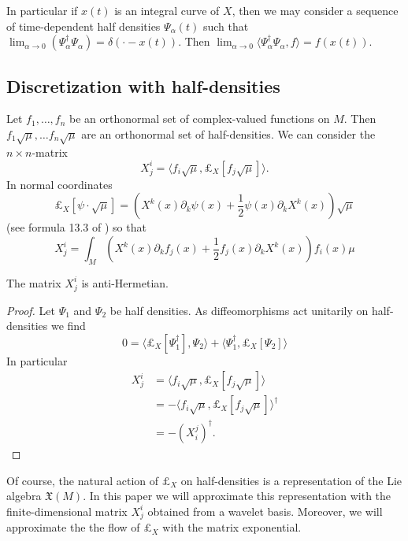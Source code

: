 In particular if $x(t)$ is an integral curve of $X$, then we may consider a sequence of time-dependent half densities $\Psi_\alpha(t)$ such that $\lim_{\alpha \to 0}( \Psi_\alpha^\dagger \Psi_\alpha) = \delta( \cdot - x(t) )$.
Then $\lim_{\alpha \to 0 } \langle \Psi_\alpha^\dagger \Psi_\alpha , f \rangle = f(x (t) )$.

\subsection{Discretization with half-densities}
Let $f_1, \dots, f_n$ be an orthonormal set of complex-valued functions on $M$.  Then $f_1 \sqrt{\mu} , \dots f_n \sqrt{\mu}$ are an orthonormal set of half-densities.  We can consider the $n \times n$-matrix
\[
	X_{j}^{i} = \langle f_i \sqrt{\mu} , \pounds_X [f_j \sqrt{\mu}]  \rangle.
\]
In normal coordinates
\[
	\pounds_X[ \psi \cdot \sqrt{\mu} ] = ( X^k(x) \partial_k \psi(x) + \frac{1}{2} \psi(x) \partial_k X^k(x) ) \sqrt{\mu}
\]
(see formula 13.3 of \cite{Meyer1998}) so that
\[
	X_j^i = \int_{M} ( X^k(x) \partial_k f_j(x) + \frac{1}{2} f_j(x) \partial_k X^k(x) ) f_i(x) \mu
\]
\begin{proposition}
	The matrix $X^i_j$ is anti-Hermetian.
\end{proposition}
\begin{proof}
	Let $\Psi_1$ and $\Psi_2$ be half densities.  As diffeomorphisms act unitarily on half-densities we find
	\[
		0 = \langle \pounds_X [\Psi_1^\dagger] , \Psi_2 \rangle + \langle \Psi_1^\dagger, \pounds_X[\Psi_2] \rangle
	\]
	In particular
	\begin{align*}
		X^i_j &= \langle f_i \sqrt{\mu} , \pounds_X [f_j \sqrt{\mu}]  \rangle \\
			&=  - \langle f_i \sqrt{\mu} , \pounds_X [f_j \sqrt{\mu}]  \rangle^\dagger \\
			&= -(X^j_i)^\dagger.
	\end{align*}
\end{proof}
Of course, the natural action of $\pounds_X$ on half-densities is a representation of the Lie algebra $\mathfrak{X}(M)$.
In this paper we will approximate this representation with the finite-dimensional matrix $X_j^i$ obtained from a wavelet basis.
Moreover, we will approximate the the flow of $\pounds_X$ with the matrix exponential.

